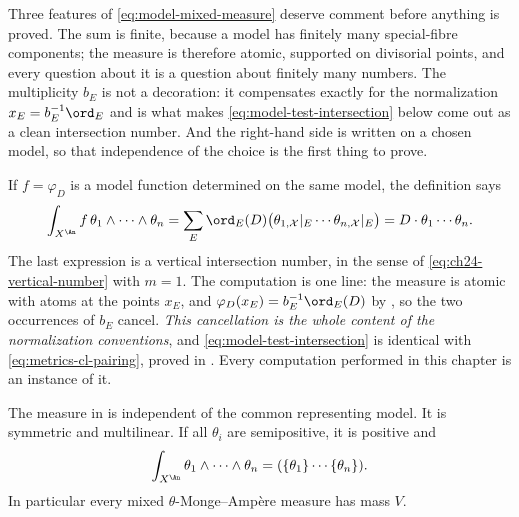 Three features of \eqref{eq:model-mixed-measure} deserve comment before
anything is proved.  The sum is finite, because a model has finitely many
special-fibre components; the measure is therefore atomic, supported on
divisorial points, and every question about it is a question about finitely
many numbers.  The multiplicity \(b_E\) is not a decoration: it compensates
exactly for the normalization \(x_E=b_E^{-1}\ord_E\) and is what makes
\eqref{eq:model-test-intersection} below come out as a clean intersection
number.  And the right-hand side is written on a chosen model, so that
independence of the choice is the first thing to prove.

If \(f=\varphi_D\) is a model function determined on the same model, the
definition says
\begin{equation}
\label{eq:model-test-intersection}
 \int_{X^{\An}}f\,\theta_1\wedge\cdots\wedge\theta_n
 =\sum_E\ord_E(D)
   \bigl(\theta_{1,\mathcal X}|_E\cdots
         \theta_{n,\mathcal X}|_E\bigr)
 =D\cdot\theta_1\cdots\theta_n.
\end{equation}
The last expression is a vertical intersection number, in the sense of
\eqref{eq:ch24-vertical-number} with \(m=1\).  The computation is one line:
the measure is atomic with atoms at the points \(x_E\), and
\(\varphi_D(x_E)=b_E^{-1}\ord_E(D)\) by
, so the two occurrences of
\(b_E\) cancel.  \emph{This cancellation is the whole content of the
normalization conventions}, and \eqref{eq:model-test-intersection} is
identical with \eqref{eq:metrics-cl-pairing}, proved in
.  Every computation performed
in this chapter is an instance of it.

\begin{proposition}\label{prop:model-ma-basic}
The measure in  is independent of
the common representing model. It is symmetric and multilinear. If all
\(\theta_i\) are semipositive, it is positive and
\begin{equation}
\label{eq:mixed-total-mass}
  \int_{X^{\An}}\theta_1\wedge\cdots\wedge\theta_n
  =(\{\theta_1\}\cdots\{\theta_n\}).
\end{equation}
In particular every mixed \(\theta\)-Monge--Amp\`ere measure has mass \(V\).
\end{proposition}


